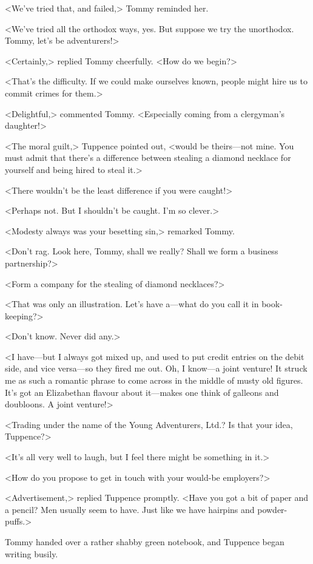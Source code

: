 <We've tried that, and failed,> Tommy reminded her.

<We've tried all the orthodox ways, yes. But suppose we try the unorthodox. Tommy, let's be adventurers!>

<Certainly,> replied Tommy cheerfully. <How do we begin?>

<That's the difficulty. If we could make ourselves known, people might hire us to commit crimes for them.>

<Delightful,> commented Tommy. <Especially coming from a clergyman's daughter!>

<The moral guilt,> Tuppence pointed out, <would be theirs—not mine. You must admit that there's a difference between stealing a diamond necklace for yourself and being hired to steal it.>

<There wouldn't be the least difference if you were caught!>

<Perhaps not. But I shouldn't be caught. I'm so clever.>

<Modesty always was your besetting sin,> remarked Tommy.

<Don't rag. Look here, Tommy, shall we really? Shall we form a business partnership?>

<Form a company for the stealing of diamond necklaces?>

<That was only an illustration. Let's have a—what do you call it in book-keeping?>

<Don't know. Never did any.>

<I have—but I always got mixed up, and used to put credit entries on the debit side, and vice versa—so they fired me out. Oh, I know—a joint venture! It struck me as such a romantic phrase to come across in the middle of musty old figures. It's got an Elizabethan flavour about it—makes one think of galleons and doubloons. A joint venture!>

<Trading under the name of the Young Adventurers, Ltd.? Is that your idea, Tuppence?>

<It's all very well to laugh, but I feel there might be something in it.>

<How do you propose to get in touch with your would-be employers?>

<Advertisement,> replied Tuppence promptly. <Have you got a bit of paper and a pencil? Men usually seem to have. Just like we have hairpins and powder-puffs.>

Tommy handed over a rather shabby green notebook, and Tuppence began writing busily.

